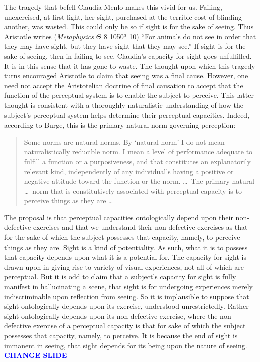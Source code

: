 \documentclass[12pt]{article}
\newcommand{\change}{\textcolor{blue}{\textbf{CHANGE SLIDE}}}
\begin{document}
The tragedy that befell Claudia Menlo makes this vivid for us. Failing, unexercised, at first light, her sight, purchased at the terrible cost of blinding another, was wasted. This could only be so if sight is for the sake of seeing. Thus Aristotle writes (\emph{Metaphysics} \( \Theta \) 8 1050\( ^{a} \) 10) ``For animals do not see in order that they may have sight, but they have sight that they may see.'' If sight is for the sake of seeing, then in failing to see, Claudia's capacity for sight goes unfulfilled. It is in this sense that it has gone to waste. The thought upon which this tragedy turns encouraged Aristotle to claim that seeing was a final cause. However, one need not accept the Aristotelian doctrine of final causation to accept that the function of the perceptual system is to enable the subject to perceive. This latter thought is consistent with a thoroughly naturalistic understanding of how the subject's perceptual system helps determine their perceptual capacities. Indeed, according to Burge, this is the primary natural norm governing perception:
\begin{quote}
	Some norms are natural norms. By ‘natural norm’ I do not mean naturalistically reducible norm. I mean a level of performance adequate to fulfill a function or a purposiveness, and that constitutes an explanatorily relevant kind, independently of any individual’s having a positive or negative attitude toward the function or the norm. \ldots\ The primary natural \dots\ norm that is constitutively associated with perceptual capacity is to perceive things as they are \ldots\ 
\end{quote}

The proposal is that perceptual capacities ontologically depend upon their non-defective exercises and that we understand their non-defective exercises as that for the sake of which the subject possesses that capacity, namely, to perceive things as they are. Sight is a kind of potentiality. As such, what it is to possess that capacity depends upon what it is a potential for. The capacity for sight is drawn upon in giving rise to variety of visual experiences, not all of which are perceptual. But it is odd to claim that a subject's capacity for sight is fully manifest in hallucinating a scene, that sight is for undergoing experiences merely indiscriminable upon reflection from seeing. So it is implausible to suppose that sight ontologically depends upon its exercise, understood unrestrictedly. Rather sight ontologically depends upon its non-defective exercise, where the non-defective exercise of a perceptual capacity is that for sake of which the subject possesses that capacity, namely, to perceive. It is because the end of sight is immanent in seeing, that sight depends for its being upon the nature of seeing. \change
\end{document}
